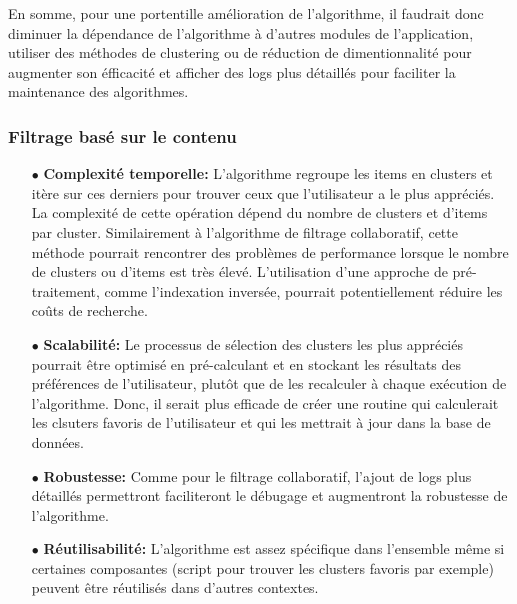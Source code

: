 \documentclass[11pt]{article}
\begin{document}
En somme, pour une portentille amélioration de l'algorithme, il faudrait donc diminuer la dépendance de l'algorithme à d'autres modules de l'application, utiliser des méthodes de clustering ou de réduction de dimentionnalité pour augmenter son éfficacité et afficher des logs plus détaillés pour faciliter la maintenance des algorithmes.

\subsubsection{Filtrage basé sur le contenu}

\begin{itemize}
	\item[$\bullet$] \textbf{Complexité temporelle:} L'algorithme regroupe les items en clusters et itère sur ces derniers pour trouver ceux que l'utilisateur a le plus appréciés. La complexité de cette opération dépend du nombre de clusters et d'items par cluster. Similairement à l'algorithme de filtrage collaboratif, cette méthode pourrait rencontrer des problèmes de performance lorsque le nombre de clusters ou d'items est très élevé. L'utilisation d'une approche de pré-traitement, comme l'indexation inversée, pourrait potentiellement réduire les coûts de recherche.\\
	
	\item[$\bullet$] \textbf{Scalabilité:} Le processus de sélection des clusters les plus appréciés pourrait être optimisé en pré-calculant et en stockant les résultats des préférences de l'utilisateur, plutôt que de les recalculer à chaque exécution de l'algorithme. Donc, il serait plus efficade de créer une routine qui calculerait les clsuters favoris de l'utilisateur et qui les mettrait à jour dans la base de données.\\
	
	\item[$\bullet$] \textbf{Robustesse:} Comme pour le filtrage collaboratif, l'ajout de logs plus détaillés permettront faciliteront le débugage et augmentront la robustesse de l'algorithme.\\

	\item[$\bullet$] \textbf{Réutilisabilité:} L'algorithme est assez spécifique dans l'ensemble même si certaines composantes (script pour trouver les clusters favoris par exemple) peuvent être réutilisés dans d'autres contextes.\\
		
\end{itemize}
\end{document}
